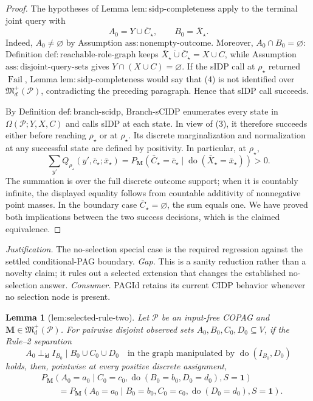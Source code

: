 \documentclass{article}
\newtheorem{lemma}{Lemma}
\begin{document}
\begin{proof}
The hypotheses of Lemma \(\mathrm{lem{:}sidp\text{-}completeness}\) apply to the terminal joint query with
\[
 A_0=Y\cup\bar C_\star,
 \qquad B_0=\bar X_\star.
\]
Indeed, \(A_0\neq\varnothing\) by Assumption \(\mathrm{ass{:}nonempty\text{-}outcome}\).  Moreover, \(A_0\cap B_0=\varnothing\): Definition \(\mathrm{def{:}reachable\text{-}role\text{-}graph}\) keeps \(\bar X_\star\mathbin{\dot\cup}\bar C_\star=X\cup C\), while Assumption \(\mathrm{ass{:}disjoint\text{-}query\text{-}sets}\) gives \(Y\cap(X\cup C)=\varnothing\).  If the sIDP call at \(\rho_\star\) returned \(\operatorname{Fail}\), Lemma \(\mathrm{lem{:}sidp\text{-}completeness}\) would say that (4) is not identified over \(\mathfrak M_d^+(\mathcal P)\), contradicting the preceding paragraph.  Hence that sIDP call succeeds.

By Definition \(\mathrm{def{:}branch\text{-}scidp}\), Branch-sCIDP enumerates every state in \(\Omega(\mathcal P;Y,X,C)\) and calls sIDP at each state.  In view of (3), it therefore succeeds either before reaching \(\rho_\star\) or at \(\rho_\star\).  Its discrete marginalization and normalization at any successful state are defined by positivity.  In particular, at \(\rho_\star\),
\[
 \sum_{y'}Q_{\rho_\star}(y',\bar c_\star;\bar x_\star)
 =P_{\mathbf M}(\bar C_\star=\bar c_\star
       \mid\operatorname{do}(\bar X_\star=\bar x_\star))>0.
\]
The summation is over the full discrete outcome support; when it is countably infinite, the displayed equality follows from countable additivity of nonnegative point masses.  In the boundary case \(\bar C_\star=\varnothing\), the sum equals one.  We have proved both implications between the two success decisions, which is the claimed equivalence.
\end{proof}
\par\smallskip\noindent \textit{Justification.} The no-selection special case is the required regression against the settled conditional-PAG boundary. \textit{Gap.} This is a sanity reduction rather than a novelty claim; it rules out a selected extension that changes the established no-selection answer. \textit{Consumer.} PAGId retains its current CIDP behavior whenever no selection node is present.

\begin{lemma}[lem:selected-rule-two]\label{lem:selected-rule-two}
Let \(\mathcal P\) be an input-free COPAG and \(\mathbf M\in\mathfrak M_d^+(\mathcal P)\).  For pairwise disjoint observed sets \(A_0,B_0,C_0,D_0\subseteq V\), if the Rule--2 separation
\[
 A_0\mathrel{\perp_{\mathsf{id}}}I_{B_0}\mid B_0\cup C_0\cup D_0
 \quad\text{in the graph manipulated by }\operatorname{do}(I_{B_0},D_0)
\]
holds, then, pointwise at every positive discrete assignment,
\[
 \begin{aligned}
 &P_{\mathbf M}(A_0=a_0\mid C_0=c_0,
       \operatorname{do}(B_0=b_0,D_0=d_0),S=\mathbf 1)\\
 &\qquad =P_{\mathbf M}(A_0=a_0\mid B_0=b_0,C_0=c_0,
       \operatorname{do}(D_0=d_0),S=\mathbf 1).
 \end{aligned}
\]
\end{lemma}
\end{document}
